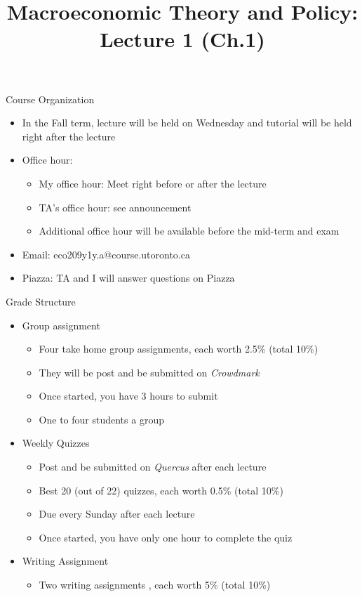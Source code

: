 \documentclass[aspectratio=1610]{beamer}
\title[Fall - Lecture 1] %
{Macroeconomic Theory and Policy: Lecture  1 (Ch.1)}
\author[University of Toronto] %
{}
\date[] %
\begin{document}
\begin{frame}
  \titlepage
\end{frame}


\begin{frame}[wide]{Course Organization}
	\begin{itemize}
		\item In the Fall term, lecture will be held on Wednesday and tutorial will be held right after the lecture
		\item Office hour: 
		\begin{itemize}
			\item My office hour: Meet right before or after the lecture
			\item TA's office hour: see announcement 
			\item Additional office hour will be available before the mid-term and exam 
		\end{itemize}
		\item Email: eco209y1y.a@course.utoronto.ca
		\item Piazza: TA and I will answer questions on Piazza
	\end{itemize}
\end{frame}

\begin{frame}[wide]{Grade Structure}
	\begin{itemize}
		\item Group assignment
		\begin{itemize}
			\item Four take home group assignments, each worth 2.5\%  (total 10\%)
			\item They will be post and be submitted on \textit{Crowdmark}
			\item Once started, you have 3 hours to submit
			\item One to four students a group			
		\end{itemize}
		\item Weekly Quizzes 
		\begin{itemize}
			\item Post and be submitted on \textit{Quercus} after each lecture
			\item Best 20 (out of 22) quizzes, each worth 0.5\% (total 10\%)
			\item Due every Sunday after each lecture
			\item Once started, you have only one hour to complete the quiz
		\end{itemize}
		\item Writing Assignment
		\begin{itemize}
			\item Two writing assignments , each worth 5\% (total 10\%)
		\end{itemize}
	\end{itemize}
\end{frame}
\end{document}
